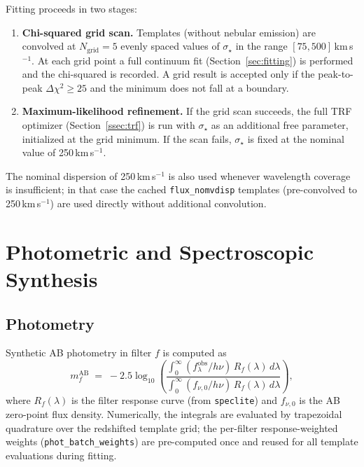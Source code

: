 \documentclass[12pt]{article}
\newcommand{\vdisp}{\sigma_{\star}}
\newcommand{\flam}{f_\lambda}
\begin{document}
Fitting proceeds in two stages:

\begin{enumerate}
  \item \textbf{Chi-squared grid scan.}  Templates (without nebular emission)
    are convolved at $N_{\mathrm{grid}} = 5$ evenly spaced values of $\vdisp$
    in the range $[75, 500]$\,km\,s$^{-1}$.  At each grid point a full
    continuum fit (Section~\ref{sec:fitting}) is performed and the chi-squared
    is recorded.  A grid result is accepted only if the peak-to-peak
    $\Delta\chi^2 \geq 25$ and the minimum does not fall at a boundary.
  \item \textbf{Maximum-likelihood refinement.}  If the grid scan succeeds,
    the full TRF optimizer (Section~\ref{ssec:trf}) is run with $\vdisp$ as
    an additional free parameter, initialized at the grid minimum.  If the
    scan fails, $\vdisp$ is fixed at the nominal value of 250\,km\,s$^{-1}$.
\end{enumerate}

The nominal dispersion of 250\,km\,s$^{-1}$ is also used whenever wavelength
coverage is insufficient; in that case the cached \texttt{flux\_nomvdisp}
templates (pre-convolved to 250\,km\,s$^{-1}$) are used directly without
additional convolution.


\section{Photometric and Spectroscopic Synthesis}
\label{sec:synthesis}

\subsection{Photometry}
\label{ssec:synthphot}

Synthetic AB photometry in filter $f$ is computed as
\begin{equation}
  m_f^{\mathrm{AB}} \;=\; -2.5\log_{10}\!\left(
    \frac{\int_0^\infty (\flam^{\mathrm{obs}} / h\nu)\,R_f(\lambda)\,d\lambda}
         {\int_0^\infty (f_{\nu,0} / h\nu)\,R_f(\lambda)\,d\lambda}
  \right),
  \label{eq:synthphot}
\end{equation}
where $R_f(\lambda)$ is the filter response curve (from
\texttt{speclite}) and $f_{\nu,0}$ is the AB zero-point flux density.
Numerically, the integrals are evaluated by trapezoidal quadrature over the
redshifted template grid; the per-filter response-weighted weights
(\texttt{phot\_batch\_weights}) are pre-computed once and reused for all
template evaluations during fitting.
\end{document}
